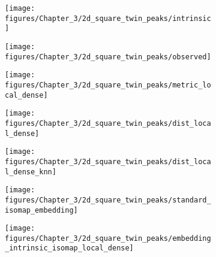 \documentclass[final,supplement]{siamart1116}
\begin{document}
\begin{figure}[h]	
	\begin{centering}
		\begin{subfigure}[b]{0.32\linewidth}
			\texttt{[image: figures/Chapter\_3/2d\_square\_twin\_peaks/intrinsic]}
			\caption{\label{fig:punctured_severed_sphere_intrinsic2}}
		\end{subfigure}\hfill
		\begin{subfigure}[b]{0.30\linewidth}
			\texttt{[image: figures/Chapter\_3/2d\_square\_twin\_peaks/observed]}
			\caption{\label{fig:punctured_severed_sphere_observed2}}
		\end{subfigure}\hfill
		\begin{subfigure}[b]{0.30\linewidth}
			\texttt{[image: figures/Chapter\_3/2d\_square\_twin\_peaks/metric\_local\_dense]}
			\caption{\label{fig:punctured_severed_sphere_intrinsic_metric2}}
		\end{subfigure}
	\end{centering}
	\begin{centering}
		\begin{subfigure}[b]{0.45\linewidth}
			\texttt{[image: figures/Chapter\_3/2d\_square\_twin\_peaks/dist\_local\_dense]}
			\caption{\label{fig:punctured_severed_sphere_intrinsic_dist_est2}}
		\end{subfigure}
		\hfill
		\begin{subfigure}[b]{0.45\linewidth}
			\texttt{[image: figures/Chapter\_3/2d\_square\_twin\_peaks/dist\_local\_dense\_knn]}
			\caption{\label{fig:punctured_severed_sphere_intrinsic_dist_est_knn2}}
		\end{subfigure}
	\end{centering}
	\begin{centering}
		\begin{subfigure}[b]{0.32\linewidth}
			\texttt{[image: figures/Chapter\_3/2d\_square\_twin\_peaks/standard\_isomap\_embedding]}
			\caption{\label{fig:punctured_severed_sphere_standard_isomap_embedding2}}
		\end{subfigure} \hfill
		\begin{subfigure}[b]{0.32\linewidth}
			\texttt{[image: figures/Chapter\_3/2d\_square\_twin\_peaks/embedding\_intrinsic\_isomap\_local\_dense]}
			\caption{\label{fig:punctured_severed_sphere_intrinsic_isomap_embedding2}}
		\end{subfigure} \hfill
		\begin{subfigure}[b]{0.32\linewidth}

\end{subfigure}
\end{centering}
\end{figure}
\end{document}
